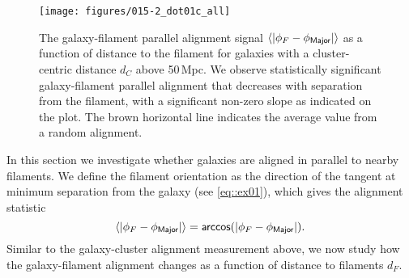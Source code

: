 \documentclass[usenatbib,useAMS]{mnras}
\theoremstyle{remark}
\newcommand{\sukhdeep}[1]{{\textcolor{magenta}{SS: #1}}}
\newcommand{\rachel}[1]{{\textcolor{cyan}{RM: #1}}}
\begin{document}
\begin{figure}
\center
\texttt{[image: figures/015-2\_dot01c\_all]}
\caption{The galaxy-filament parallel alignment signal $\langle|\phi_F-\phi_{\sf Major}|\rangle$
as a function of distance to the filament for galaxies with a cluster-centric distance $d_C$ above 50\,Mpc. 
We observe statistically significant galaxy-filament parallel alignment that
decreases with separation from the filament, with a significant non-zero slope as indicated on the plot. 
The brown horizontal line indicates the average value from a random alignment. 
}
\label{fig::align}
\end{figure}

In this section we investigate whether galaxies are aligned in parallel to nearby filaments. We define the filament orientation as the direction of the tangent at minimum separation from the galaxy (see \autoref{eq::ex01}), which gives 
{
the alignment statistic
\begin{equation}
\langle|\phi_F-\phi_{\sf Major}|\rangle = {\sf arccos}(|\phi_F-\phi_{\sf Major}|).
\end{equation}}
Similar to the galaxy-cluster alignment measurement above,
we now study how the galaxy-filament alignment changes as a function of 
distance to filaments $d_F$.
\end{document}
